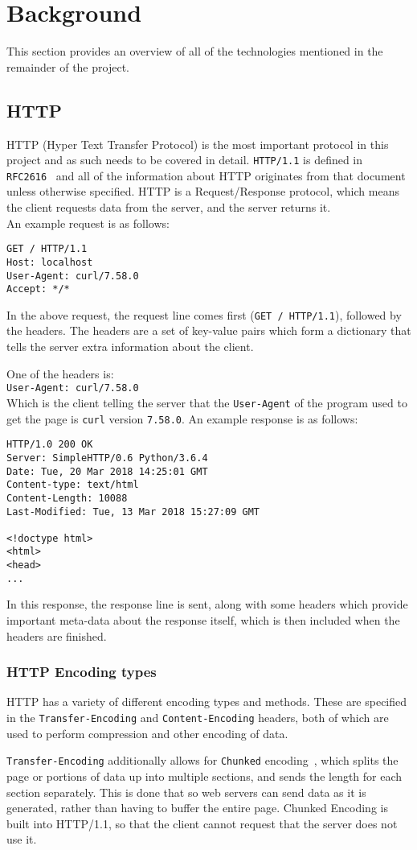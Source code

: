 \section{Background}
This section provides an overview of all of the technologies mentioned in the remainder of the project.
\subsection{HTTP}
HTTP (Hyper Text Transfer Protocol) is the most important protocol in this project and as such needs to be covered in detail.
\texttt{HTTP/1.1} is defined in \texttt{RFC2616}~\cite{rfc2616} and all of the information about HTTP originates from that document unless otherwise specified.
HTTP is a Request/Response protocol, which means the client requests data from the server, and the server returns it.\\
An example request is as follows:
\begin{verbatim}
GET / HTTP/1.1
Host: localhost
User-Agent: curl/7.58.0
Accept: */*
\end{verbatim}
In the above request, the request line comes first (\texttt{GET / HTTP/1.1}), followed by the headers. The headers are a set of key-value pairs which form a dictionary that tells the server extra information about the client.

One of the headers is:\\
\texttt{User-Agent: curl/7.58.0}\\
Which is the client telling the server that the \texttt{User-Agent} of the program used to get the page is \texttt{curl} version \texttt{7.58.0}.\vspace{0.4cm}\newline
An example response is as follows:
\begin{verbatim}
HTTP/1.0 200 OK
Server: SimpleHTTP/0.6 Python/3.6.4
Date: Tue, 20 Mar 2018 14:25:01 GMT
Content-type: text/html
Content-Length: 10088
Last-Modified: Tue, 13 Mar 2018 15:27:09 GMT

<!doctype html>
<html>
<head>
...
\end{verbatim}
In this response, the response line is sent, along with some headers which provide important meta-data about the response itself, which is then included when the headers are finished.

\subsubsection{HTTP Encoding types}
HTTP has a variety of different encoding types and methods.
These are specified in the \texttt{Transfer-Encoding} and \texttt{Content-Encoding} headers, both of which are  used to perform compression and other encoding of data.\par
\texttt{Transfer-Encoding} additionally allows for \texttt{Chunked} encoding~\cite{rfc7230}, which splits the page or portions of data up into multiple sections, and sends the length for each section separately. This is done that so web servers can send data as it is generated, rather than having to buffer the entire page. Chunked Encoding is built into HTTP/1.1, so that the client cannot request that the server does not use it.

